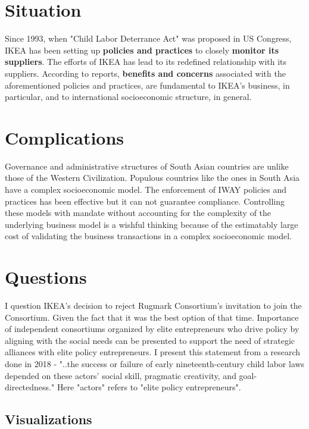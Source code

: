\documentclass[a4paper, 11pt, margin=1in]{article}
\begin{document}
\section{Situation}
Since 1993, when "Child Labor Deterrance Act" was proposed in US Congress, IKEA has been setting up \textbf{policies and practices} to closely \textbf{monitor its suppliers}. The efforts of IKEA has lead to its redefined relationship with its suppliers. According to reports, \textbf{benefits and concerns} associated with the aforementioned policies and practices, are fundamental to IKEA's business, in particular, and to international socioeconomic structure, in general.
\section{Complications}
Governance and administrative structures of South Asian countries are unlike those of the Western Civilization. Populous countries like the ones in South Asia have a complex socioeconomic model. 
The enforcement of IWAY policies and practices has been effective but it can not guarantee compliance. Controlling these models with mandate without accounting for the complexity of the underlying business model is a wishful thinking because of the estimatably large cost of validating the business transactions in a complex socioeconomic model.

\section{Questions}
I question IKEA's decision to reject Rugmark Consortium's invitation to join the Consortium. Given the fact that it was the best option of that time. \cite{publichearing1998}
Importance of independent consortiums organized by elite entrepreneurs who drive policy by aligning with the social needs can be presented to support the need of strategic alliances with elite policy entrepreneurs. I present this statement from a research done in 2018 - "..the success or failure of early nineteenth-century child labor laws depended on these actors’ social skill, pragmatic creativity, and goal-directedness." \cite{anderson2018policy} Here "actors" refers to "elite policy entrepreneurs".




\subsection{Visualizations}
\end{document}
